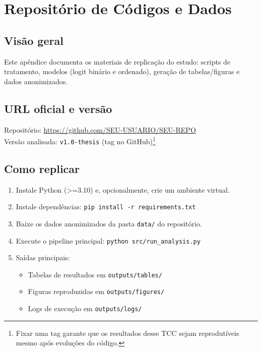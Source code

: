 \begin{apendicesenv}
\begin{landscape}
\begin{ThreePartTable}
\begin{longtable}
\bottomrule 
\insertTableNotes 
\end{longtable} 
\end{ThreePartTable}


\endgroup
\end{landscape}

\chapter{Repositório de Códigos e Dados}\label{ap:repo}

\section{Visão geral}
Este apêndice documenta os materiais de replicação do estudo: scripts de tratamento,
modelos (logit binário e ordenado), geração de tabelas/figuras e dados anonimizados.

\section{URL oficial e versão}
Repositório: \url{https://github.com/SEU-USUARIO/SEU-REPO} \\
Versão analisada: \texttt{v1.0-thesis} (tag no GitHub)\footnote{Fixar uma tag garante que os resultados
desse TCC sejam reprodutíveis mesmo após evoluções do código.}

\section{Como replicar}\label{ap:repo:execucao}
\begin{enumerate}
  \item Instale Python (>=3.10) e, opcionalmente, crie um ambiente virtual.
  \item Instale dependências: \texttt{pip install -r requirements.txt}
  \item Baixe os dados anonimizados da pasta \texttt{data/} do repositório.
  \item Execute o pipeline principal: \texttt{python src/run\_analysis.py}
  \item Saídas principais:
        \begin{itemize}
          \item Tabelas de resultados em \texttt{outputs/tables/}
          \item Figuras reproduzidas em \texttt{outputs/figures/}
          \item Logs de execução em \texttt{outputs/logs/}
        \end{itemize}
\end{enumerate}


\end{apendicesenv}
